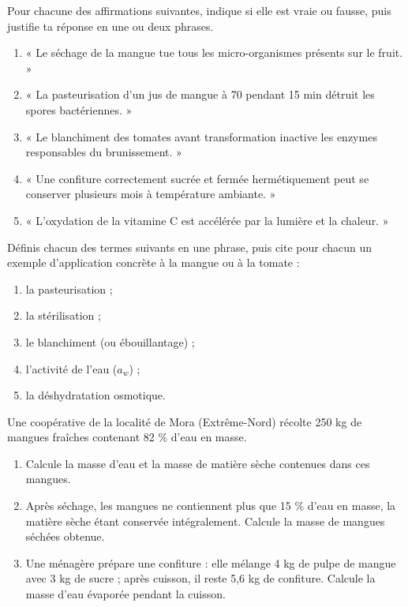\documentclass[11pt]{article}
\begin{document}
\begin{exercice}
Pour chacune des affirmations suivantes, indique si elle est vraie ou fausse, puis justifie ta réponse en une ou deux phrases.
\begin{enumerate}
\item « Le séchage de la mangue tue tous les micro-organismes présents sur le fruit. »
\item « La pasteurisation d'un jus de mangue à 70 \textcelsius{} pendant 15 min détruit les spores bactériennes. »
\item « Le blanchiment des tomates avant transformation inactive les enzymes responsables du brunissement. »
\item « Une confiture correctement sucrée et fermée hermétiquement peut se conserver plusieurs mois à température ambiante. »
\item « L'oxydation de la vitamine C est accélérée par la lumière et la chaleur. »
\end{enumerate}
\end{exercice}

\begin{exercice}
Définis chacun des termes suivants en une phrase, puis cite pour chacun un exemple d'application concrète à la mangue ou à la tomate :
\begin{enumerate}
\item la pasteurisation ;
\item la stérilisation ;
\item le blanchiment (ou ébouillantage) ;
\item l'activité de l'eau ($a_w$) ;
\item la déshydratation osmotique.
\end{enumerate}
\end{exercice}

\begin{exercice}
Une coopérative de la localité de Mora (Extrême-Nord) récolte 250 kg de mangues fraîches contenant 82 \% d'eau en masse.
\begin{enumerate}
\item Calcule la masse d'eau et la masse de matière sèche contenues dans ces mangues.
\item Après séchage, les mangues ne contiennent plus que 15 \% d'eau en masse, la matière sèche étant conservée intégralement. Calcule la masse de mangues séchées obtenue.
\item Une ménagère prépare une confiture : elle mélange 4 kg de pulpe de mangue avec 3 kg de sucre ; après cuisson, il reste 5,6 kg de confiture. Calcule la masse d'eau évaporée pendant la cuisson.
\end{enumerate}
\end{exercice}
\end{document}
